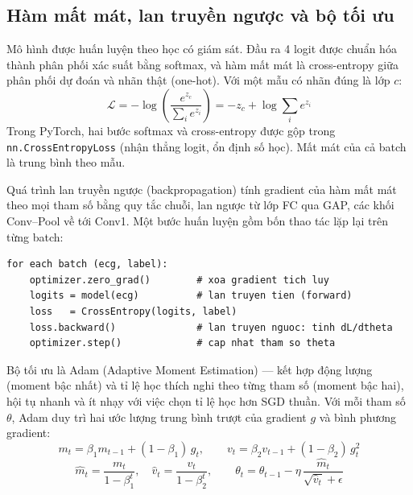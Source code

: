 \documentclass[12pt,a4paper]{article}
\begin{document}
\subsection{Hàm mất mát, lan truyền ngược và bộ tối ưu}

Mô hình được huấn luyện theo học có giám sát. Đầu ra 4 logit được chuẩn hóa thành phân phối
xác suất bằng softmax, và hàm mất mát là cross-entropy giữa phân phối dự đoán và nhãn thật
(one-hot). Với một mẫu có nhãn đúng là lớp $c$:
\begin{equation}
  \mathcal{L} = -\log\!\left( \frac{e^{z_c}}{\sum_{i} e^{z_i}} \right) = -z_c + \log\!\sum_{i} e^{z_i}
\end{equation}
Trong PyTorch, hai bước softmax và cross-entropy được gộp trong \texttt{nn.CrossEntropyLoss}
(nhận thẳng logit, ổn định số học). Mất mát của cả batch là trung bình theo mẫu.

Quá trình lan truyền ngược (backpropagation) tính gradient của hàm mất mát theo mọi tham số
bằng quy tắc chuỗi, lan ngược từ lớp FC qua GAP, các khối Conv--Pool về tới Conv1. Một bước
huấn luyện gồm bốn thao tác lặp lại trên từng batch:

\begin{lstlisting}
for each batch (ecg, label):
    optimizer.zero_grad()        # xoa gradient tich luy
    logits = model(ecg)          # lan truyen tien (forward)
    loss   = CrossEntropy(logits, label)
    loss.backward()              # lan truyen nguoc: tinh dL/dtheta
    optimizer.step()             # cap nhat tham so theta
\end{lstlisting}

Bộ tối ưu là Adam (Adaptive Moment Estimation) --- kết hợp động lượng (moment bậc nhất) và
tỉ lệ học thích nghi theo từng tham số (moment bậc hai), hội tụ nhanh và ít nhạy với việc
chọn tỉ lệ học hơn SGD thuần. Với mỗi tham số $\theta$, Adam duy trì hai ước lượng trung bình
trượt của gradient $g$ và bình phương gradient:
\begin{equation}
  m_t = \beta_1 m_{t-1} + (1-\beta_1)\,g_t, \qquad v_t = \beta_2 v_{t-1} + (1-\beta_2)\,g_t^{2}
\end{equation}
\begin{equation}
  \hat{m}_t = \frac{m_t}{1-\beta_1^{t}}, \quad \hat{v}_t = \frac{v_t}{1-\beta_2^{t}}, \qquad
  \theta_t = \theta_{t-1} - \eta\,\frac{\hat{m}_t}{\sqrt{\hat{v}_t}+\epsilon}
\end{equation}
\end{document}
